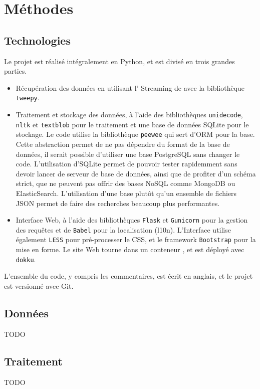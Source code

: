 
\section{Méthodes}

\subsection{Technologies}

Le projet est réalisé intégralement en Python, et est divisé en trois grandes
parties.

\begin{itemize}
  \item Récupération des données en utilisant l’\api{} Streaming de \twt{} avec
    la bibliothèque \verb|tweepy|.
  \item Traitement et stockage des données, à l’aide des bibliothèques
    \verb|unidecode|, \verb|nltk| et \verb|textblob| pour le traitement et une
    base de données SQLite pour le stockage. Le code utilise la bibliothèque
    \verb|peewee| qui sert d’ORM pour la base. Cette abstraction permet de ne
    pas dépendre du format de la base de données, il serait possible d’utiliser
    une base PostgreSQL sans changer le code. L’utilisation d’SQLite permet de
    pouvoir tester rapidemment sans devoir lancer de serveur de base de
    données, ainsi que de profiter d’un schéma strict, que ne peuvent pas
    offrir des bases NoSQL comme MongoDB ou ElasticSearch. L’utilisation d’une
    base plutôt qu’un ensemble de fichiers JSON permet de faire des recherches
    beaucoup plus performantes.
  \item Interface Web, à l’aide des bibliothèques \verb|Flask| et
    \verb|Gunicorn| pour la gestion des requêtes et de \verb|Babel| pour la
    localisation (l10n). L’Interface utilise également \verb|LESS| pour
    pré-processer le CSS, et le framework \verb|Bootstrap| pour la mise en
    forme. Le site Web tourne dans un conteneur , et est déployé avec
    \verb|dokku|.
\end{itemize}

L’ensemble du code, y compris les commentaires, est écrit en anglais, et le
projet est versionné avec Git.

\subsection{Données}

TODO

\subsection{Traitement}

TODO
